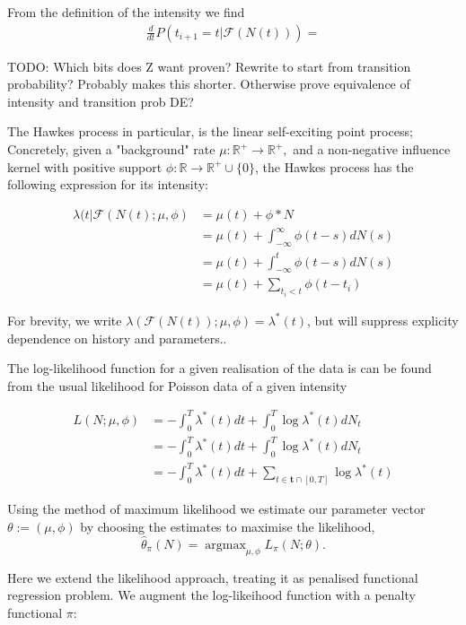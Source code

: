 \documentclass[11pt]{article}
\def\lt{<}
\begin{document}
From the definition of the intensity we find \[\begin{aligned}
\frac{d}{dt}P(t_{i+1}=t|\mathcal{F}(N(t)))=
\end{aligned}\]

TODO: Which bits does Z want proven? Rewrite to start from transition
probability? Probably makes this shorter. Otherwise prove equivalence of
intensity and transition prob DE?

    The Hawkes process \cite{hawkes_point_1971} in particular, is the linear
self-exciting point process; Concretely, given a "background" rate
\(\mu:\mathbb{R}^+\rightarrow\mathbb{R}^+,\) and a non-negative
influence kernel with positive support
\(\phi:\mathbb{R}\rightarrow\mathbb{R}^+\cup\{0\}\), the Hawkes process
has the following expression for its intensity:

\[
\begin{aligned}
\lambda(t|\mathcal{F}(N(t);\mu,\phi) &= \mu(t) + \phi * N\\
&= \mu(t)  + \int_{-\infty}^{\infty}\phi(t-s)dN(s)\\
&= \mu(t) + \int_{-\infty}^{t}\phi(t-s)dN(s)\\
&= \mu(t) + \sum_{t_i\lt t}\phi(t-t_i)
\end{aligned}
\]

For brevity, we write
\(\lambda(\mathcal{F}(N(t));\mu,\phi)=\lambda^*(t)\), but will suppress
explicity dependence on history and parameters..

    The log-likelihood function for a given realisation of the data is can
be found from the usual likelihood for Poisson data of a given intensity
\cite{ozaki_etimating_1979}

\[\begin{aligned}L(N;\mu,\phi) &=-\int_0^T\lambda^*(t)dt + \int_0^T\log \lambda^*(t) dN_t \\
&=-\int_0^T\lambda^*(t)dt + \int_0^T\log \lambda^*(t) dN_t \\
&=-\int_0^T\lambda^*(t)dt + \sum_{t\in\mathbf{t}\cap [0,T]}\log \lambda^*(t)
\end{aligned}\]

Using the method of maximum likelihood we estimate our parameter vector
\(\theta:=(\mu, \phi)\) by choosing the estimates to maximise the
likelihood,
\[\hat{\theta}_\pi(N) = \operatorname{argmax}_{\mu,\phi} L_\pi(N;\theta).\]

    Here we extend the likelihood approach, treating it as penalised
functional regression problem. We augment the log-likeihood function
with a penalty functional \(\pi\):
\end{document}
